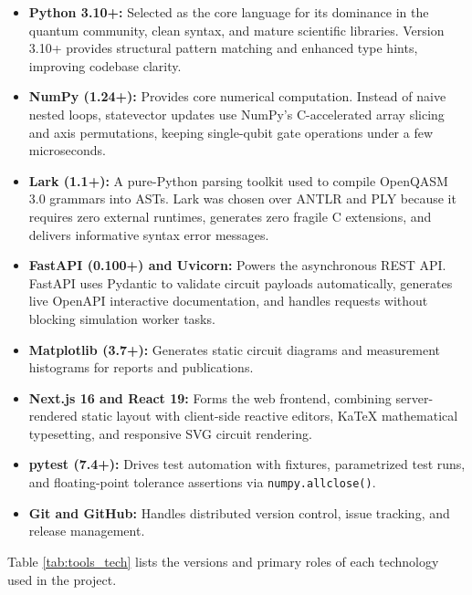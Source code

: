 \begin{itemize}[leftmargin=*]
    \item \textbf{Python 3.10+:} Selected as the core language for its dominance in the quantum community, clean syntax, and mature scientific libraries. Version 3.10+ provides structural pattern matching and enhanced type hints, improving codebase clarity.
    \item \textbf{NumPy (1.24+):} Provides core numerical computation. Instead of naive nested loops, statevector updates use NumPy's C-accelerated array slicing and axis permutations, keeping single-qubit gate operations under a few microseconds.
    \item \textbf{Lark (1.1+):} A pure-Python parsing toolkit used to compile OpenQASM 3.0 grammars into ASTs. Lark was chosen over ANTLR and PLY because it requires zero external runtimes, generates zero fragile C extensions, and delivers informative syntax error messages.
    \item \textbf{FastAPI (0.100+) and Uvicorn:} Powers the asynchronous REST API. FastAPI uses Pydantic to validate circuit payloads automatically, generates live OpenAPI interactive documentation, and handles requests without blocking simulation worker tasks.
    \item \textbf{Matplotlib (3.7+):} Generates static circuit diagrams and measurement histograms for reports and publications.
    \item \textbf{Next.js 16 and React 19:} Forms the web frontend, combining server-rendered static layout with client-side reactive editors, KaTeX mathematical typesetting, and responsive SVG circuit rendering.
    \item \textbf{pytest (7.4+):} Drives test automation with fixtures, parametrized test runs, and floating-point tolerance assertions via \texttt{numpy.allclose()}.
    \item \textbf{Git and GitHub:} Handles distributed version control, issue tracking, and release management.
\end{itemize}

Table \ref{tab:tools_tech} lists the versions and primary roles of each technology used in the project.

\vspace{0.4cm}

